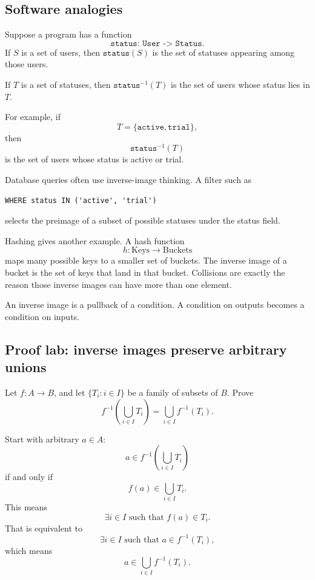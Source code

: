 \subsection{Software analogies}

Suppose a program has a function
\[
\texttt{status: User -> Status}.
\]
If $S$ is a set of users, then $\texttt{status}(S)$ is the set of statuses appearing among those users.

If $T$ is a set of statuses, then $\texttt{status}^{-1}(T)$ is the set of users whose status lies in $T$.

For example, if
\[
T=\{\texttt{active},\texttt{trial}\},
\]
then
\[
\texttt{status}^{-1}(T)
\]
is the set of users whose status is active or trial.

Database queries often use inverse-image thinking. A filter such as

\begin{verbatim}
WHERE status IN ('active', 'trial')
\end{verbatim}

selects the preimage of a subset of possible statuses under the status field.

Hashing gives another example. A hash function
\[
h:\text{Keys}\to\text{Buckets}
\]
maps many possible keys to a smaller set of buckets. The inverse image of a bucket is the set of keys that land in that bucket. Collisions are exactly the reason those inverse images can have more than one element.

\begin{intuitionbox}
An inverse image is a pullback of a condition. A condition on outputs becomes a condition on inputs.
\end{intuitionbox}

\subsection{Proof lab: inverse images preserve arbitrary unions}

\begin{labbox}
Let $f:A\to B$, and let $\{T_i:i\in I\}$ be a family of subsets of $B$. Prove
\[
f^{-1}\left(\bigcup_{i\in I}T_i\right)=\bigcup_{i\in I}f^{-1}(T_i).
\]

Start with arbitrary $a\in A$:
\[
a\in f^{-1}\left(\bigcup_{i\in I}T_i\right)
\]
if and only if
\[
f(a)\in\bigcup_{i\in I}T_i.
\]
This means
\[
\exists i\in I\text{ such that }f(a)\in T_i.
\]
That is equivalent to
\[
\exists i\in I\text{ such that }a\in f^{-1}(T_i),
\]
which means
\[
a\in\bigcup_{i\in I}f^{-1}(T_i).
\]
\end{labbox}

